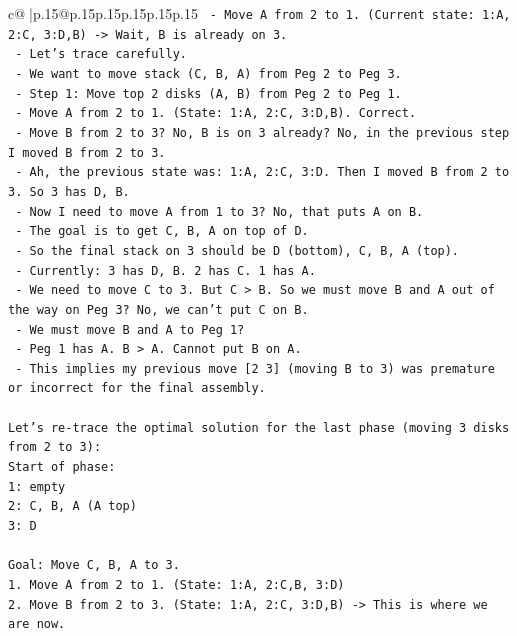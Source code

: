 \documentclass{article}
\begin{document}
{\begin{supertabular}{c@{$\;$}|p{.15\linewidth}@{}p{.15\linewidth}p{.15\linewidth}p{.15\linewidth}p{.15\linewidth}p{.15\linewidth}}
{{{\texttt{   {-} Move A from 2 to 1. (Current state: 1:A, 2:C, 3:D,B) {-}> Wait, B is already on 3.} \\
\texttt{   {-} Let's trace carefully.} \\
\texttt{   {-} We want to move stack (C, B, A) from Peg 2 to Peg 3.} \\
\texttt{   {-} Step 1: Move top 2 disks (A, B) from Peg 2 to Peg 1.} \\
\texttt{     {-} Move A from 2 to 1. (State: 1:A, 2:C, 3:D,B). Correct.} \\
\texttt{     {-} Move B from 2 to 3? No, B is on 3 already? No, in the previous step I moved B from 2 to 3.} \\
\texttt{     {-} Ah, the previous state was: 1:A, 2:C, 3:D. Then I moved B from 2 to 3. So 3 has D, B.} \\
\texttt{     {-} Now I need to move A from 1 to 3? No, that puts A on B.} \\
\texttt{     {-} The goal is to get C, B, A on top of D.} \\
\texttt{     {-} So the final stack on 3 should be D (bottom), C, B, A (top).} \\
\texttt{     {-} Currently: 3 has D, B. 2 has C. 1 has A.} \\
\texttt{     {-} We need to move C to 3. But C > B. So we must move B and A out of the way on Peg 3? No, we can't put C on B.} \\
\texttt{     {-} We must move B and A to Peg 1?} \\
\texttt{     {-} Peg 1 has A. B > A. Cannot put B on A.} \\
\texttt{     {-} This implies my previous move {[}2 3{]} (moving B to 3) was premature or incorrect for the final assembly.} \\
\\ 
\texttt{Let's re{-}trace the optimal solution for the last phase (moving 3 disks from 2 to 3):} \\
\texttt{Start of phase:} \\
\texttt{1: empty} \\
\texttt{2: C, B, A (A top)} \\
\texttt{3: D} \\
\\ 
\texttt{Goal: Move C, B, A to 3.} \\
\texttt{1. Move A from 2 to 1. (State: 1:A, 2:C,B, 3:D)} \\
\texttt{2. Move B from 2 to 3. (State: 1:A, 2:C, 3:D,B) {-}> This is where we are now.} \\
}}}
\end{supertabular}}
\end{document}
